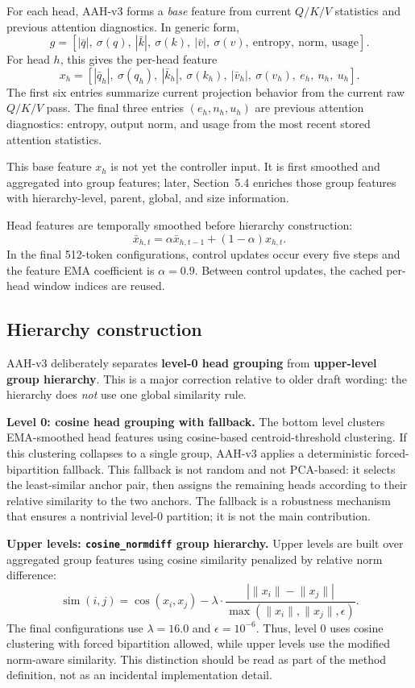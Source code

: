 \documentclass[11pt]{article}
\begin{document}
For each head, AAH-v3 forms a \emph{base} feature from current \(Q/K/V\) statistics and previous attention diagnostics. In generic form,
\[
  g = [|\bar q|,\ \sigma(q),\ |\bar k|,\ \sigma(k),\ |\bar v|,\ \sigma(v),\ \text{entropy},\ \text{norm},\ \text{usage}].
\]
For head \(h\), this gives the per-head feature
\[
  x_h = [|\bar q_h|,\ \sigma(q_h),\ |\bar k_h|,\ \sigma(k_h),\ |\bar v_h|,\ \sigma(v_h),\ e_h,\ n_h,\ u_h].
\]
The first six entries summarize current projection behavior from the current raw \(Q/K/V\) pass. The final three entries \((e_h,n_h,u_h)\) are previous attention diagnostics: entropy, output norm, and usage from the most recent stored attention statistics.

This base feature \(x_h\) is not yet the controller input. It is first smoothed and aggregated into group features; later, Section~5.4 enriches those group features with hierarchy-level, parent, global, and size information.

Head features are temporally smoothed before hierarchy construction:
\[
  \bar x_{h,t} = \alpha \bar x_{h,t-1} + (1-\alpha)x_{h,t}.
\]
In the final 512-token configurations, control updates occur every five steps and the feature EMA coefficient is \(\alpha=0.9\). Between control updates, the cached per-head window indices are reused.

\subsection{Hierarchy construction}

AAH-v3 deliberately separates \textbf{level-0 head grouping} from \textbf{upper-level group hierarchy}. This is a major correction relative to older draft wording: the hierarchy does \emph{not} use one global similarity rule.

\textbf{Level 0: cosine head grouping with fallback.} The bottom level clusters EMA-smoothed head features using cosine-based centroid-threshold clustering. If this clustering collapses to a single group, AAH-v3 applies a deterministic forced-bipartition fallback. This fallback is not random and not PCA-based: it selects the least-similar anchor pair, then assigns the remaining heads according to their relative similarity to the two anchors. The fallback is a robustness mechanism that ensures a nontrivial level-0 partition; it is not the main contribution.

\textbf{Upper levels: \texttt{cosine\_normdiff} group hierarchy.} Upper levels are built over aggregated group features using cosine similarity penalized by relative norm difference:
\[
  \operatorname{sim}(i,j) = \cos(x_i,x_j) - \lambda \cdot \frac{\left|\lVert x_i\rVert - \lVert x_j\rVert\right|}{\max(\lVert x_i\rVert,\lVert x_j\rVert,\epsilon)}.
\]
The final configurations use \(\lambda=16.0\) and \(\epsilon=10^{-6}\). Thus, level 0 uses cosine clustering with forced bipartition allowed, while upper levels use the modified norm-aware similarity. This distinction should be read as part of the method definition, not as an incidental implementation detail.
\end{document}
